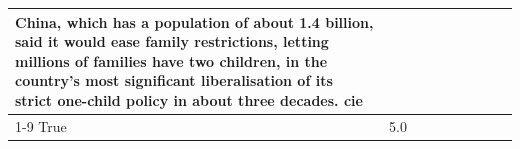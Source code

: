 \begin{table}[H]
\begin{tabular}{lllrlllll}
China, which has a population of about 1.4 billion, said it would ease family restrictions, letting millions of families have two children, in the country's most significant liberalisation of its strict one-child policy in about three decades. cie \\
\cline{1-9}
True & 5.0%
\end{tabular}
\end{table}
